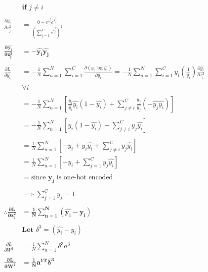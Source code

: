 \documentclass{article}
\begin{document}
	\begin{align*}
		&  \textbf{if }   j \neq i\\ \\
		\frac{\partial \hat{y_i}}{\partial z_j^{2}}& = \frac{0-e^{z_i^2}e^{z_j^2}}{(\sum_{j=1}^Ce^{z_j^2})^2} \\\\
		\boldsymbol{\frac{\partial \hat{y_i}}{\partial z_j^{2}}} & \boldsymbol{=-\hat{y_i}\hat{y_j}}
	\\
	\\
		\frac{\partial L}{\partial \hat{y_i}} &= -\frac{1}{N}\sum_{n=1}^N\sum_{i=1}^C\frac{\partial (y_i\log{\hat{y_i}})}{\partial \hat{y_i}} = -\frac{1}{N}\sum_{n=1}^N\sum_{i=1}^C y_i \left(\frac{1}{\hat{y_i}} \right) \frac{\partial \hat{y_i}}			  			{\partial z_i^2}\\ \\
		&  \forall i \\ \\
		&= -\frac{1}{N}\sum_{n=1}^N \left[  \frac{ y_i}{\hat{y_i}} \hat{y_i} \left(1-\hat{y_i} \right) + \sum_{j\neq i}^C \frac{y_j}{\hat{y_j}}  (-\hat{y_j}\hat{y_i}) \right]\\ \\
		&= -\frac{1}{N}\sum_{n=1}^N \left[ y_i(1-\hat{y_i}) - \sum_{j\neq i}^C y_j\hat{y_i} \right]\\ \\
		&= \frac{1}{N}\sum_{n=1}^N \left[ -y_i+y_i\hat{y_i} +  \sum_{j\neq i}^Cy_j\hat{y_i} \right]\\
		&= \frac{1}{N}\sum_{n=1}^N \left[ -y_i+ \sum_{j= 1}^Cy_j\hat{y_i} \right]\\ \\
		&= \text{since } \boldsymbol{y_j} \text{ is one-hot encoded}\\ \\
		&\implies \sum_{j=1}^Cy_j = 1\\ \\
		\boldsymbol{\therefore{} \frac{\partial L}{\partial z_i^2}} &= \boldsymbol{\frac{1}{N}\sum_{n=1}^N(\hat{y_i}-y_i)}
	\\
	\\
		& \textbf{Let } \delta^3 = (\hat{y_i}-y_i)\\ \\
		\frac{\partial L}{\partial W^2} &= \frac{1}{N}\sum_{n=1}^N\delta^3a^3\\\\
		\boldsymbol{\frac{\partial L}{\partial W^2}}& \boldsymbol{=\frac{1}{N}a^{1T}\delta^3} \\ \\
	\end{align*}
\end{document}
